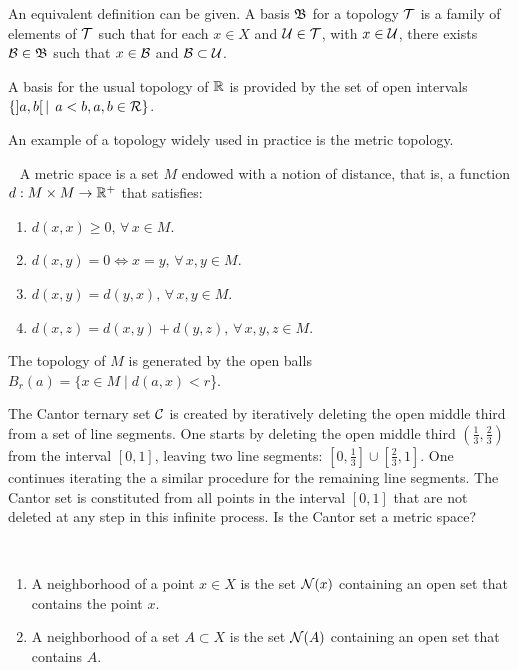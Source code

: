 \noindent 

An equivalent definition can be given. A basis $\mathfrak{B}$ for a topology $\mathcal{T}$ is a family of elements of $\mathcal{T}$ such that for each $x\in X$ and $\mathcal{U}\in \mathcal{T}$, with $ x\in \mathcal{U}$, there exists $\mathcal{B}\in \mathfrak{B}$ such that $x\in \mathcal{B}$ and $\mathcal{B}\subset \mathcal{U}$.

\begin{example}
A basis for the usual topology of $\mathbb{R}$ is provided by the set of open intervals $\{]a,b[ \, \mid\,  a<b, a,b\in \mathcal{R}\}$.
\end{example}

An example of a topology widely used in practice is the metric topology.

\vspace{5pt}
\begin{definition}~\label{D:EspMet} %
A metric space is a set $M$ endowed with a notion of distance, that is, a function $d : M\times M \to \mathbb{R}^{+}$ that satisfies:
\begin{enumerate}
\item $d(x,x)\geq 0, \, \forall \, x\in M$.
\item $d(x,y)= 0 \iff x=y, \, \forall \, x,y\in M$.
\item $d(x,y)=d(y,x), \, \forall \, x,y\in M$.
\item $d(x,z)=d(x,y)+d(y,z), \, \forall \, x,y,z\in M$.
\end{enumerate}
The topology of $M$ is generated by the open balls $B_{r}(a)=\{x\in M \mid d(a,x)<r$\}.
\end{definition}
\begin{ex}\label{Ex:1}
The Cantor ternary set $\mathcal{C}$
 is created by iteratively deleting the open middle third from a set of line segments. One starts by deleting the open middle third $(\frac{1}{3},\frac {2}{3})$ from the interval 
$[0,1]$, leaving two line segments: 
$[0,\frac {1}{3}]\cup [\frac {2}{3},1]$. One continues iterating the a similar procedure for the remaining line segments. The Cantor set is constituted from all points in the interval $[0,1]$ that are not deleted at any step in this infinite process.
Is the Cantor set a metric space?
\end{ex}
\begin{definition}[{\bf Neighborhood}]
\

\begin{enumerate}
\item A neighborhood of a point $x \in X$ is the set $\mathcal{N}(x)$ containing an open set that contains the point $x$.
\item A neighborhood of a set $A \subset X$ is the set $\mathcal{N}(A)$ containing an open set that contains $A$.
\end{enumerate}
\end{definition}

